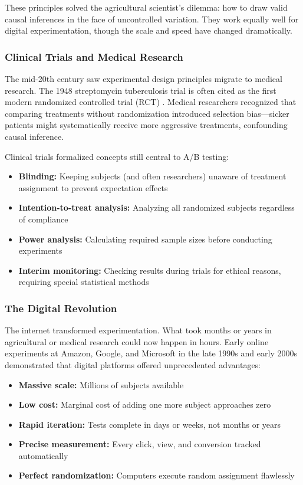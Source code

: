 These principles solved the agricultural scientist's dilemma: how to draw valid causal inferences in the face of uncontrolled variation. They work equally well for digital experimentation, though the scale and speed have changed dramatically.

\subsubsection{Clinical Trials and Medical Research}

The mid-20th century saw experimental design principles migrate to medical research. The 1948 streptomycin tuberculosis trial is often cited as the first modern randomized controlled trial (RCT) \citep{lind1753treatise}. Medical researchers recognized that comparing treatments without randomization introduced selection bias—sicker patients might systematically receive more aggressive treatments, confounding causal inference.

Clinical trials formalized concepts still central to A/B testing:
\begin{itemize}
    \item \textbf{Blinding:} Keeping subjects (and often researchers) unaware of treatment assignment to prevent expectation effects
    \item \textbf{Intention-to-treat analysis:} Analyzing all randomized subjects regardless of compliance
    \item \textbf{Power analysis:} Calculating required sample sizes before conducting experiments
    \item \textbf{Interim monitoring:} Checking results during trials for ethical reasons, requiring special statistical methods
\end{itemize}

\subsubsection{The Digital Revolution}

The internet transformed experimentation. What took months or years in agricultural or medical research could now happen in hours. Early online experiments at Amazon, Google, and Microsoft in the late 1990s and early 2000s demonstrated that digital platforms offered unprecedented advantages:

\begin{itemize}
    \item \textbf{Massive scale:} Millions of subjects available
    \item \textbf{Low cost:} Marginal cost of adding one more subject approaches zero
    \item \textbf{Rapid iteration:} Tests complete in days or weeks, not months or years
    \item \textbf{Precise measurement:} Every click, view, and conversion tracked automatically
    \item \textbf{Perfect randomization:} Computers execute random assignment flawlessly
\end{itemize}


